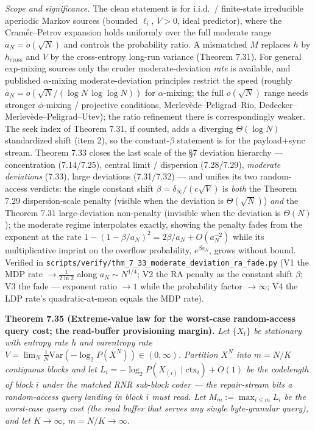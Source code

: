 \documentclass[
]{article}
\begin{document}
\emph{Scope and significance.} The clean statement is for i.i.d.\ / finite-state
irreducible aperiodic Markov sources (bounded $\ell_i$, $V>0$, ideal predictor), where
the Cram\'er--Petrov expansion holds uniformly over the full moderate range
$a_N=o(\sqrt N)$ and controls the probability ratio. A mismatched $M$ replaces $h$ by
$h_{\mathrm{cross}}$ and $V$ by the cross-entropy long-run variance (Theorem 7.31). For
general exp-mixing sources only the cruder moderate-deviation \emph{rate} is available,
and published $\alpha$-mixing moderate-deviation principles restrict the speed (roughly
$a_N=o(\sqrt N/(\log N\,\log\log N))$ for $\alpha$-mixing; the full $o(\sqrt N)$ range
needs stronger $\phi$-mixing / projective conditions, Merlev\`ede--Peligrad--Rio,
Dedecker--Merlev\`ede--Peligrad--Utev); the ratio refinement there is correspondingly
weaker. The seek index of Theorem 7.31, if counted, adds a diverging $\Theta(\log N)$
standardized shift (item 2), so the constant-$\beta$ statement is for the payload$+$sync
stream. Theorem 7.33 closes the last scale of
the §7 deviation hierarchy --- concentration (7.14/7.25), central limit / dispersion
(7.28/7.29), \emph{moderate deviations} (7.33), large deviations (7.31/7.32) --- and
unifies its two random-access verdicts: the single constant shift $\beta=\delta_\infty/
(c\sqrt V)$ is \emph{both} the Theorem 7.29 dispersion-scale penalty (visible when the
deviation is $\Theta(\sqrt N)$) \emph{and} the Theorem 7.31 large-deviation
non-penalty (invisible when the deviation is $\Theta(N)$); the moderate regime
interpolates exactly, showing the penalty fades from the exponent at the rate
$1-(1-\beta/a_N)^2=2\beta/a_N+O(a_N^{-2})$ while its multiplicative imprint on the
overflow probability, $e^{\beta a_N}$, grows without bound. Verified in
\texttt{scripts/verify/thm\_7\_33\_moderate\_deviation\_ra\_fade.py} (V1 the MDP rate
$\to\tfrac1{2\ln2}$ along $a_N\sim N^{1/4}$; V2 the RA penalty as the constant shift
$\beta$; V3 the fade --- exponent ratio $\to1$ while the probability factor $\to\infty$;
V4 the LDP rate's quadratic-at-mean equals the MDP rate).

\textbf{Theorem 7.35 (Extreme-value law for the worst-case random-access query cost; the
read-buffer provisioning margin).} \emph{Let $\{X_t\}$ be stationary with entropy rate $h$
and varentropy rate $V=\lim_N\frac1N\mathrm{Var}(-\log_2 P(X^N))\in(0,\infty)$. Partition
$X^N$ into $m=N/K$ contiguous blocks and let $L_i=-\log_2 P(X_{(i)}\mid\mathrm{ctx}_i)+O(1)$
be the codelength of block $i$ under the matched RNR sub-block coder --- the repair-stream
bits a random-access query landing in block $i$ must read. Let $M_m:=\max_{i\le m}L_i$ be
the worst-case query cost (the read buffer that serves any single byte-granular query), and
let $K\to\infty$, $m=N/K\to\infty$.}
\end{document}
